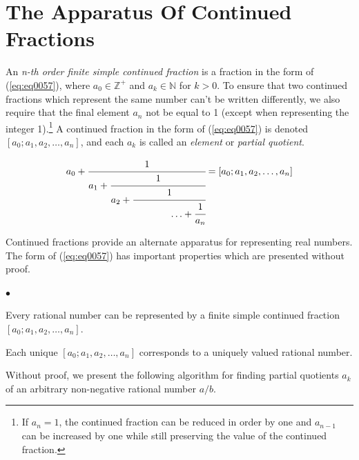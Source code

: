 \documentclass{esub2acm}
\newcommand{\intsetnonneg}{{\mathbb{Z}^+}}
\newcommand{\intsetpos}{{\mathbb{N}}}
\newenvironment{propenum}{\begin{list}
               {$\bullet$}{\setlength{\labelwidth}{3mm}\setlength{\leftmargin}{6mm}}}
               {\end{list}}
\begin{document}
\section{The Apparatus Of Continued Fractions}
\label{sec:continuedfractions}

An \emph{n-th order finite simple continued fraction} is a fraction in the form
of (\ref{eq:eq0057}), where $a_0 \in \intsetnonneg$
and $a_{k} \in \intsetpos$ for $k > 0$.  To ensure that two continued fractions
which represent the same number can't be written differently, we also require that
the final element $a_n$ not be equal to 1 (except when
representing the integer 1).\footnote{If $a_n=1$, the continued fraction can be reduced in order by
one and $a_{n-1}$ can be increased by one while still preserving the value of the continued
fraction.}
A continued fraction
in the form of (\ref{eq:eq0057}) is denoted $[a_0; a_1, a_2, \ldots, a_n]$, and each
$a_k$ is called an \emph{element} or \emph{partial quotient}.

\begin{equation}
\label{eq:eq0057}
a_0 + \cfrac{1}{a_1 + \cfrac{1}{a_2
    + \cfrac{1}{\;\;\;\;\;\;\;\;\;\;\;\;\;\;\ldots + \cfrac{1}{a_n}}}}
    =
    [a_0; a_1, a_2, \ldots , a_n]
\end{equation}

Continued fractions provide an alternate apparatus for
representing real numbers.  The form of (\ref{eq:eq0057}) has
important properties which are presented without proof.

\begin{propenum}
\item Every rational number can be represented by a finite
      simple continued fraction $[a_{0};a_{1},a_{2},\ldots{} ,a_{n}]$.
\item Each unique $[a_{0};a_{1},a_{2},\ldots{} ,a_{n}]$ corresponds to a
      uniquely valued rational number.
\end{propenum}

Without proof, we present the following algorithm for
finding partial quotients $a_k$ of an arbitrary
non-negative rational number $a/b$.
\end{document}
